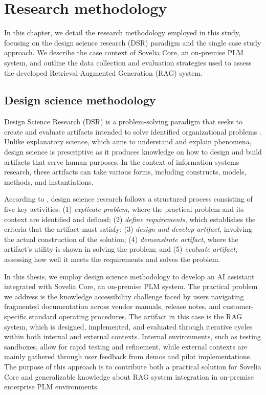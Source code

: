 \chapter{Research methodology}
\label{ch:research-methodology}

In this chapter, we detail the research methodology employed in this study, focusing on the design science research (DSR) paradigm and the single case study approach. We describe the case context of Sovelia Core, an on-premise PLM system, and outline the data collection and evaluation strategies used to assess the developed Retrieval-Augmented Generation (RAG) system.

\section{Design science methodology}
\label{sec:design-science-methodology}

Design Science Research (DSR) is a problem-solving paradigm that seeks to create and evaluate artifacts intended to solve identified organizational problems \parencite{johannesson_introduction_2021}. Unlike explanatory science, which aims to understand and explain phenomena, design science is prescriptive as it produces knowledge on how to design and build artifacts that serve human purposes. In the context of information systems research, these artifacts can take various forms, including constructs, models, methods, and instantiations.

According to \textcite{johannesson_introduction_2021}, design science research follows a structured process consisting of five key activities: (1) \emph{explicate problem}, where the practical problem and its context are identified and defined; (2) \emph{define requirements}, which establishes the criteria that the artifact must satisfy; (3) \emph{design and develop artifact}, involving the actual construction of the solution; (4) \emph{demonstrate artifact}, where the artifact's utility is shown in solving the problem; and (5) \emph{evaluate artifact}, assessing how well it meets the requirements and solves the problem.

In this thesis, we employ design science methodology to develop an AI assistant integrated with Sovelia Core, an on-premise PLM system. The practical problem we address is the knowledge accessibility challenge faced by users navigating fragmented documentation across vendor manuals, release notes, and customer-specific standard operating procedures. The artifact in this case is the RAG system, which is designed, implemented, and evaluated through iterative cycles within both internal and external contexts. Internal environments, such as testing sandboxes, allow for rapid testing and refinement, while external contexts are mainly gathered through user feedback from demos and pilot implementations. The purpose of this approach is to contribute both a practical solution for Sovelia Core and generalizable knowledge about RAG system integration in on-premise enterprise PLM environments.

